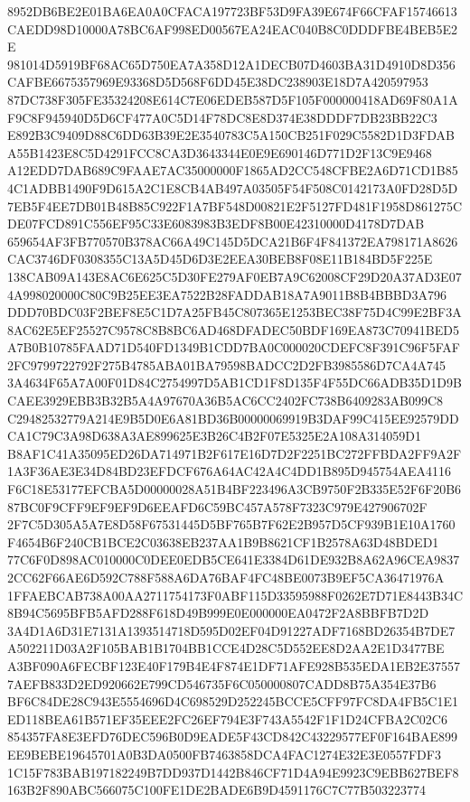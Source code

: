 \documentclass[UTF8,fontset=fandol,zihao=-4,a4paper]{ctexart}
\begin{document}
{{8952DB6BE2E01BA6EA0A0CFACA197723BF53D9FA39E674F66CFAF15746613CAEDD98D10000A78BC6AF998ED00567EA24EAC040B8C0DDDFBE4BEB5E2E
981014D5919BF68AC65D750EA7A358D12A1DECB07D4603BA31D4910D8D356CAFBE6675357969E93368D5D568F6DD45E38DC238903E18D7A420597953
87DC738F305FE35324208E614C7E06EDEB587D5F105F000000418AD69F80A1AF9C8F945940D5D6CF477A0C5D14F78DC8E8D374E38DDDF7DB23BB22C3
E892B3C9409D88C6DD63B39E2E3540783C5A150CB251F029C5582D1D3FDABA55B1423E8C5D4291FCC8CA3D3643344E0E9E690146D771D2F13C9E9468
A12EDD7DAB689C9FAAE7AC35000000F1865AD2CC548CFBE2A6D71CD1B854C1ADBB1490F9D615A2C1E8CB4AB497A03505F54F508C0142173A0FD28D5D
7EB5F4EE7DB01B48B85C922F1A7BF548D00821E2F5127FD481F1958D861275CDE07FCD891C556EF95C33E6083983B3EDF8B00E42310000D4178D7DAB
659654AF3FB770570B378AC66A49C145D5DCA21B6F4F841372EA798171A8626CAC3746DF0308355C13A5D45D6D3E2EEA30BEB8F08E11B184BD5F225E
138CAB09A143E8AC6E625C5D30FE279AF0EB7A9C62008CF29D20A37AD3E074A998020000C80C9B25EE3EA7522B28FADDAB18A7A9011B8B4BBBD3A796
DDD70BDC03F2BEF8E5C1D7A25FB45C807365E1253BEC38F75D4C99E2BF3A8AC62E5EF25527C9578C8B8BC6AD468DFADEC50BDF169EA873C70941BED5
A7B0B10785FAAD71D540FD1349B1CDD7BA0C000020CDEFC8F391C96F5FAF2FC9799722792F275B4785ABA01BA79598BADCC2D2FB3985586D7CA4A745
3A4634F65A7A00F01D84C2754997D5AB1CD1F8D135F4F55DC66ADB35D1D9BCAEE3929EBB3B32B5A4A97670A36B5AC6CC2402FC738B6409283AB099C8
C29482532779A214E9B5D0E6A81BD36B00000069919B3DAF99C415EE92579DDCA1C79C3A98D638A3AE899625E3B26C4B2F07E5325E2A108A314059D1
B8AF1C41A35095ED26DA714971B2F617E16D7D2F2251BC272FFBDA2FF9A2F1A3F36AE3E34D84BD23EFDCF676A64AC42A4C4DD1B895D945754AEA4116
F6C18E53177EFCBA5D00000028A51B4BF223496A3CB9750F2B335E52F6F20B687BC0F9CFF9EF9EF9D6EEAFD6C59BC457A578F7323C979E427906702F
2F7C5D305A5A7E8D58F67531445D5BF765B7F62E2B957D5CF939B1E10A1760F4654B6F240CB1BCE2C03638EB237AA1B9B8621CF1B2578A63D48BDED1
77C6F0D898AC010000C0DEE0EDB5CE641E3384D61DE932B8A62A96CEA98372CC62F66AE6D592C788F588A6DA76BAF4FC48BE0073B9EF5CA36471976A
1FFAEBCAB738A00AA2711754173F0ABF115D33595988F0262E7D71E8443B34C8B94C5695BFB5AFD288F618D49B999E0E000000EA0472F2A8BBFB7D2D
3A4D1A6D31E7131A1393514718D595D02EF04D91227ADF7168BD26354B7DE7A502211D03A2F105BAB1B1704BB1CCE4D28C5D552EE8D2AA2E1D3477BE
A3BF090A6FECBF123E40F179B4E4F874E1DF71AFE928B535EDA1EB2E375577AEFB833D2ED920662E799CD546735F6C050000807CADD8B75A354E37B6
BF6C84DE28C943E5554696D4C698529D252245BCCE5CFF97FC8DA4FB5C1E1ED118BEA61B571EF35EEE2FC26EF794E3F743A5542F1F1D24CFBA2C02C6
854357FA8E3EFD76DEC596B0D9EADE5F43CD842C43229577EF0F164BAE899EE9BEBE19645701A0B3DA0500FB7463858DCA4FAC1274E32E3E0557FDF3
1C15F783BAB197182249B7DD937D1442B846CF71D4A94E9923C9EBB627BEF8163B2F890ABC566075C100FE1DE2BADE6B9D4591176C7C77B503223774
}}
\end{document}
